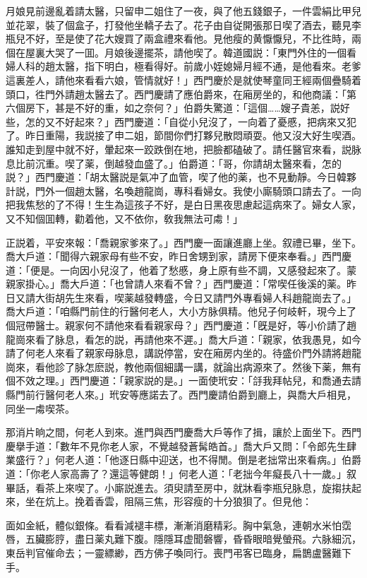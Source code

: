 月娘見前邊亂着請太醫，只留申二姐住了一夜，與了他五錢銀子，一件雲絹比甲兒並花翠，裝了個盒子，打發他坐轎子去了。花子由自従開張那日喫了酒去，聽見李瓶兒不好，至是使了花大嫂買了兩盒禮來看他。見他瘦的黄懨懨兒，不比徃時，兩個在屋裏大哭了一囬。月娘後邊擺茶，請他喫了。韓道國説：「東門外住的一個看婦人科的趙太醫，指下明白，極看得好。前歲小姪媳婦月經不通，是他看來。老爹這裏差人，請他來看看六娘，管情就好！」西門慶於是就使琴童同王經兩個疊騎着頭口，徃門外請趙太醫去了。西門慶請了應伯爵來，在廂房坐的，和他商議：「第六個房下，甚是不好的重，如之奈何？」伯爵失驚道：「這個……嫂子貴恙，説好些，怎的又不好起來？」西門慶道：「自從小兒沒了，一向着了憂慼，把病來又犯了。昨日重陽，我説接了申二姐，節間你們打夥兒散悶頑耍。他又沒大好生喫酒。誰知走到屋中就不好，暈起來一跤跌倒在地，把臉都磕破了。請任醫官來看，説脉息比前沉重。喫了薬，倒越發血盛了。」伯爵道：「哥，你請胡太醫來看，怎的説？」西門慶道：「胡太醫説是氣冲了血管，喫了他的薬，也不見動靜。今日韓夥計説，門外一個趙太醫，名喚趙龍崗，專科看婦女。我使小廝騎頭口請去了。一向把我焦愁的了不得！生生為這孩子不好，是白日黑夜思慮起這病來了。婦女人家，又不知個囬轉，勸着他，又不依你，敎我無法可䖏！」

正説着，平安來報：「喬親家爹來了。」西門慶一面讓進廳上坐。叙禮已畢，坐下。喬大戶道：「聞得六親家母有些不安，昨日舍甥到家，請房下便來奉看。」西門慶道：「便是。一向因小兒沒了，他着了愁慼，身上原有些不調，又感發起來了。蒙親家掛心。」喬大戶道：「也曾請人來看不曾？」西門慶道：「常喫任後溪的薬。昨日又請大街胡先生來看，喫薬越發轉盛，今日又請門外專看婦人科趙龍崗去了。」喬大戶道：「咱縣門前住的行醫何老人，大小方脉俱精。他兒子何岐軒，現今上了個冠帶醫士。親家何不請他來看看親家母？」西門慶道：「旣是好，等小价請了趙龍崗來看了脉息，看怎的説，再請他來不遲。」喬大戶道：「親家，依我愚見，如今請了何老人來看了親家母脉息，講説停當，安在廂房内坐的。待盛价門外請將趙龍崗來，看他診了脉怎麽説，教他兩個細講一講，就論出病源來了。然後下薬，無有個不效之理。」西門慶道：「親家説的是。」一面使玳安：「㧱我拜帖兒，和喬通去請縣門前行醫何老人來。」玳安等應諾去了。西門慶請伯爵到廳上，與喬大戶相見，同坐一䖏喫茶。

那消片晌之間，何老人到來。進門與西門慶喬大戶等作了揖，讓於上面坐下。西門慶擧手道：「數年不見你老人家，不覺越發蒼髯皓首。」喬大戶又問：「令郎先生肆業盛行？」何老人道：「他逐日縣中迎送，也不得閒。倒是老拙常出來看病。」伯爵道：「你老人家高壽了？還這等健朗！」何老人道：「老拙今年癡長八十一歲。」叙畢話，看茶上來喫了。小廝説進去。須臾請至房中，就牀看李瓶兒脉息，旋搊扶起來，坐在炕上。挽着香雲，阻隔三焦，形容瘦的十分狼狽了。但見他：

\begin{myquote}
面如金紙，體似銀條。看看減褪丰標，漸漸消磨精彩。胸中氣急，連朝水米怕霑唇，五臟膨脝，盡日薬丸難下腹。隱隱耳虚聞磐響，昏昏眼暗覺螢飛。六脉細沉，東岳判官催命去；一靈縹緲，西方佛子喚同行。喪門弔客已臨身，扁鵲盧醫難下手。
\end{myquote}

